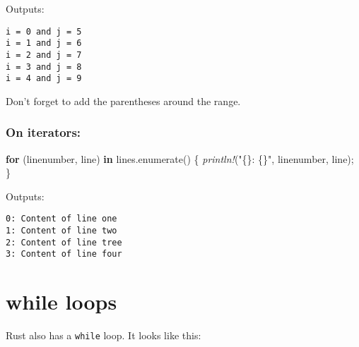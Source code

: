 \documentclass[a4paper,]{book}
\newenvironment{Shaded}{\begin{snugshade}}{\end{snugshade}}
\newcommand{\KeywordTok}[1]{\textcolor[rgb]{0.13,0.29,0.53}{\textbf{{#1}}}}
\newcommand{\DecValTok}[1]{\textcolor[rgb]{0.00,0.00,0.81}{{#1}}}
\newcommand{\ConstantTok}[1]{\textcolor[rgb]{0.00,0.00,0.00}{{#1}}}
\newcommand{\StringTok}[1]{\textcolor[rgb]{0.31,0.60,0.02}{{#1}}}
\newcommand{\CommentTok}[1]{\textcolor[rgb]{0.56,0.35,0.01}{\textit{{#1}}}}
\newcommand{\PreprocessorTok}[1]{\textcolor[rgb]{0.56,0.35,0.01}{\textit{{#1}}}}
\newcommand{\NormalTok}[1]{{#1}}
\begin{document}
Outputs:

\begin{verbatim}
i = 0 and j = 5
i = 1 and j = 6
i = 2 and j = 7
i = 3 and j = 8
i = 4 and j = 9
\end{verbatim}

Don't forget to add the parentheses around the range.

\subsubsection{On iterators:}\label{on-iterators}

\begin{Shaded}
\begin{Highlighting}[]
\KeywordTok{for} \NormalTok{(linenumber, line) }\KeywordTok{in} \NormalTok{lines.enumerate() \{}
    \PreprocessorTok{println!}\NormalTok{(}\StringTok{"\{\}: \{\}"}\NormalTok{, linenumber, line);}
\NormalTok{\}}
\end{Highlighting}
\end{Shaded}

Outputs:

\begin{verbatim}
0: Content of line one
1: Content of line two
2: Content of line tree
3: Content of line four
\end{verbatim}

\section{while loops}\label{sec--while-loops}

Rust also has a \texttt{while} loop. It looks like this:

\begin{Shaded}
\end{Shaded}
\end{document}
